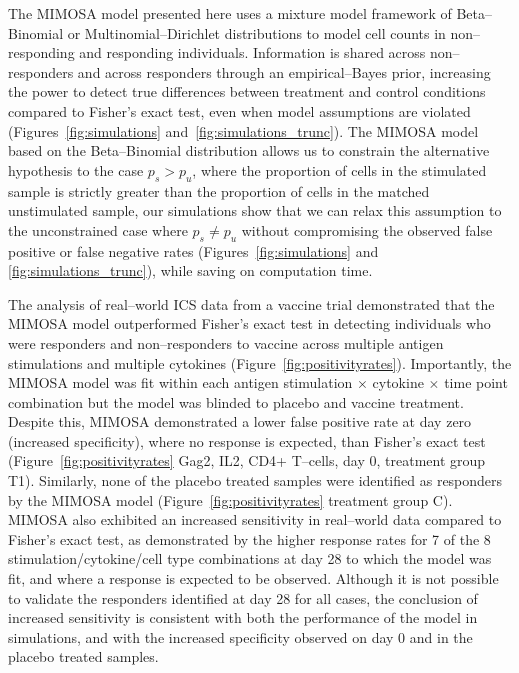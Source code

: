 \documentclass[11pt]{article}
\begin{document}
The MIMOSA model presented here uses a mixture model framework of Beta--Binomial or Multinomial--Dirichlet distributions to model cell counts in non--responding and responding individuals. Information is shared across non--responders and across responders through an empirical--Bayes prior, increasing the power to detect true differences between treatment and control conditions compared to Fisher's exact test, even when model assumptions are violated (Figures~\ref{fig:simulations} and~\ref{fig:simulations_trunc}). The MIMOSA model based on the Beta--Binomial distribution allows us to constrain the alternative hypothesis to the case $p_s > p_u$, where the proportion of cells in the stimulated sample is strictly greater than the proportion of cells in the matched unstimulated sample, our simulations show that we can relax this assumption to the unconstrained case where $p_s\ne p_u$ without compromising the observed false positive or false negative rates (Figures~\ref{fig:simulations} and \ref{fig:simulations_trunc}), while saving on computation time.

The analysis of real--world ICS data from a vaccine trial demonstrated that the MIMOSA model outperformed Fisher's exact test in detecting individuals who were responders and non--responders to vaccine across multiple antigen stimulations and multiple cytokines (Figure~\ref{fig:positivityrates}). Importantly, the MIMOSA model was fit within each antigen stimulation $\times$ cytokine $\times$ time point combination but the model was blinded to placebo and vaccine treatment. Despite this, MIMOSA demonstrated a lower false positive rate at day zero (increased specificity), where no response is expected, than Fisher's exact test (Figure~\ref{fig:positivityrates} Gag2, IL2, CD4+ T--cells, day 0, treatment group T1). Similarly, none of the placebo treated samples were identified as responders by the MIMOSA model (Figure~\ref{fig:positivityrates} treatment group C). MIMOSA also exhibited an increased sensitivity in real--world data compared to Fisher's exact test, as demonstrated by the higher response rates for 7 of the 8 stimulation/cytokine/cell type combinations at day 28 to which the model was fit, and where a response is expected to be observed. Although it is not possible to validate the responders identified at day 28 for all cases, the conclusion of increased sensitivity is consistent with both the performance of the model in simulations, and with the increased specificity observed on day 0 and in the placebo treated samples. 
\end{document}
